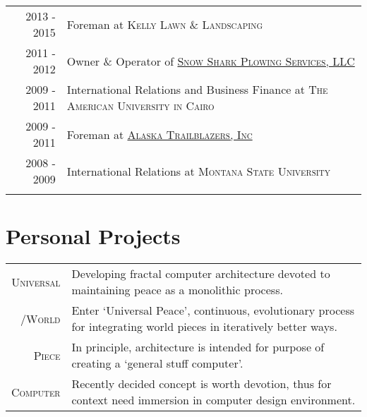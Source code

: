 \documentclass[letter,11pt]{article}
\begin{document}
\begin{center}
{\begin{tabular}{r|l}
\addlinespace[8pt]

		\textsc{2013 - 2015}
	&	Foreman at \textsc{Kelly Lawn \& Landscaping}
	\\
	
\addlinespace[8pt]

		\textsc{2011 - 2012}
	&	Owner \& Operator of 
		\href{https://github.com/blairmunroakusa/portfolio.worksamples/tree/master/snowshark}
		{\textsc{Snow Shark Plowing Services, LLC}}
	\\

\addlinespace[8pt]

		\textsc{2009 - 2011}
	&	International Relations and Business Finance at \textsc{The American University in Cairo}
	\\

\addlinespace[8pt]

		\textsc{2009 - 2011}
	&	Foreman at 
		\href{https://github.com/blairmunroakusa/portfolio.worksamples/tree/master/AKTrailblazers}
		{\textsc{Alaska Trailblazers, Inc}}
	\\
	
\addlinespace[8pt]

		\textsc{2008 - 2009}
	&	International Relations at \textsc{Montana State University}
	\\
	
\addlinespace[10pt]

\end{tabular}

\section{Personal Projects}


\begin{tabular}{r|l}

\addlinespace[8pt]

		\hspace{13.8pt}\textsc{Universal}
	&	\scriptsize{Developing fractal computer architecture devoted to maintaining peace as a monolithic process.}
	\\
		\textsc{/World}
	&	\scriptsize{Enter `Universal Peace', continuous, evolutionary process for integrating world pieces in iteratively better ways.}
	\\
		\textsc{Piece}
	&	\scriptsize{In principle, architecture is intended for purpose of creating a `general stuff computer'.}
	\\
		\textsc{Computer}
	&	\scriptsize{Recently decided concept is worth devotion, thus for context need immersion in computer design environment.}
	\\
	

\end{tabular}}
\end{center}
\end{document}
